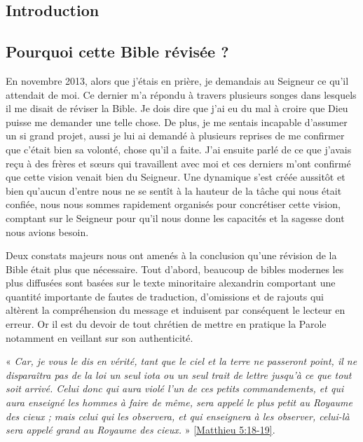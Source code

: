\begin{center}{\LARGE \section*{Introduction}}\end{center}

\subsection*{Pourquoi cette Bible révisée ?}

En novembre 2013, alors que j’étais en prière, je demandais au Seigneur ce qu’il attendait de moi. Ce dernier m’a répondu à travers plusieurs songes dans lesquels il me disait de réviser la Bible. Je dois dire que j’ai eu du mal à croire que Dieu puisse me demander une telle chose. De plus, je me sentais incapable d’assumer un si grand projet, aussi je lui ai demandé à plusieurs reprises  de me confirmer que c’était bien sa volonté, chose qu’il a faite. J’ai ensuite parlé de ce que j’avais reçu à des frères et sœurs qui travaillent avec moi et ces derniers m’ont confirmé que cette vision venait bien du Seigneur. Une dynamique s’est créée  aussitôt et bien qu’aucun d’entre nous ne se sentît à la hauteur de la tâche qui nous était confiée, nous nous sommes rapidement organisés pour concrétiser cette vision, comptant sur le Seigneur pour qu’il nous donne les capacités et la sagesse dont nous avions besoin. 

Deux constats majeurs nous ont amenés à la conclusion qu’une révision de la Bible était plus que nécessaire. Tout d’abord, beaucoup de bibles modernes les plus diffusées sont basées sur le texte minoritaire alexandrin comportant une quantité importante de fautes de traduction, d’omissions et de rajouts qui altèrent la compréhension du message et induisent par conséquent le lecteur en erreur. Or il est du devoir de tout chrétien de mettre en pratique la Parole notamment en veillant sur son authenticité.

« \emph{Car, je vous le dis en vérité, tant que le ciel et la terre ne passeront point, il ne disparaîtra pas de la loi un seul iota ou un seul trait de lettre jusqu’à ce que tout soit arrivé. Celui donc qui aura violé l'un de ces petits commandements, et qui aura enseigné les hommes à faire de même, sera appelé le plus petit au Royaume des cieux ; mais celui qui les observera, et qui enseignera à les observer, celui-là sera appelé grand au Royaume des cieux.} » \vref{Matthieu 5:18-19}.


